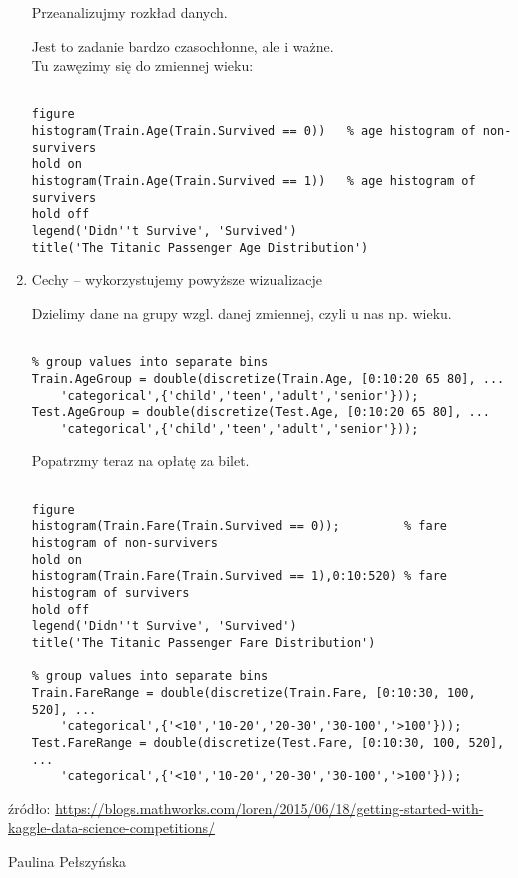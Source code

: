 \documentclass[12pt]{amsbook}
\newenvironment{bottompar}{\par\vspace*{\fill}}{\clearpage}
\theoremstyle{definition}
\begin{document}
\begin{enumerate}
Przeanalizujmy rozkład danych.

Jest to zadanie bardzo czasochłonne, ale i ważne.\\
Tu zawęzimy się do zmiennej wieku:

\begin{lstlisting}

figure
histogram(Train.Age(Train.Survived == 0))   % age histogram of non-survivers
hold on
histogram(Train.Age(Train.Survived == 1))   % age histogram of survivers
hold off
legend('Didn''t Survive', 'Survived')
title('The Titanic Passenger Age Distribution')
\end{lstlisting}


\item Cechy -- wykorzystujemy powyższe wizualizacje

Dzielimy dane na grupy wzgl. danej zmiennej, czyli u nas np. wieku.

\begin{lstlisting}

% group values into separate bins
Train.AgeGroup = double(discretize(Train.Age, [0:10:20 65 80], ...
    'categorical',{'child','teen','adult','senior'}));
Test.AgeGroup = double(discretize(Test.Age, [0:10:20 65 80], ...
    'categorical',{'child','teen','adult','senior'}));

\end{lstlisting}

Popatrzmy teraz na opłatę za bilet.

\begin{lstlisting}

figure
histogram(Train.Fare(Train.Survived == 0));         % fare histogram of non-survivers
hold on
histogram(Train.Fare(Train.Survived == 1),0:10:520) % fare histogram of survivers
hold off
legend('Didn''t Survive', 'Survived')
title('The Titanic Passenger Fare Distribution')

% group values into separate bins
Train.FareRange = double(discretize(Train.Fare, [0:10:30, 100, 520], ...
    'categorical',{'<10','10-20','20-30','30-100','>100'}));
Test.FareRange = double(discretize(Test.Fare, [0:10:30, 100, 520], ...
    'categorical',{'<10','10-20','20-30','30-100','>100'})); 

\end{lstlisting}


\end{enumerate}







źródło: \url{https://blogs.mathworks.com/loren/2015/06/18/getting-started-with-kaggle-data-science-competitions/}


\begin{bottompar}
\begin{flushright}
Paulina Pełszyńska
\end{flushright}
\end{bottompar}
\end{document}
